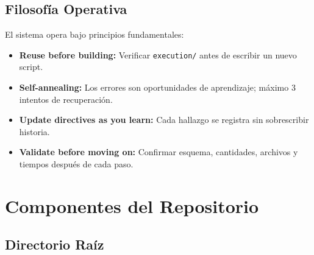 \documentclass[12pt, a4paper]{article}
\begin{document}
\subsection{Filosofía Operativa}

El sistema opera bajo principios fundamentales:
\begin{itemize}[leftmargin=*]
    \item \textbf{Reuse before building:} Verificar \texttt{execution/} antes de escribir un nuevo script.
    \item \textbf{Self-annealing:} Los errores son oportunidades de aprendizaje; máximo 3 intentos de recuperación.
    \item \textbf{Update directives as you learn:} Cada hallazgo se registra sin sobrescribir historia.
    \item \textbf{Validate before moving on:} Confirmar esquema, cantidades, archivos y tiempos después de cada paso.
\end{itemize}

\section{Componentes del Repositorio}

\subsection{Directorio Raíz}
\end{document}
